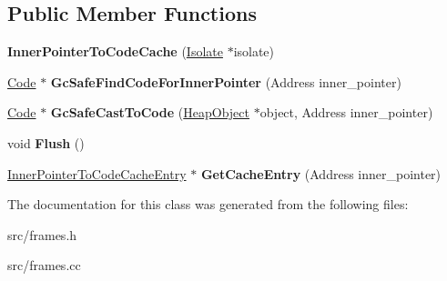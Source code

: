 \subsection*{Public Member Functions}
\begin{DoxyCompactItemize}
\item 
\hypertarget{classv8_1_1internal_1_1_inner_pointer_to_code_cache_aa5648205deaf18119d17308276caa507}{}{\bfseries Inner\+Pointer\+To\+Code\+Cache} (\hyperlink{classv8_1_1internal_1_1_isolate}{Isolate} $\ast$isolate)\label{classv8_1_1internal_1_1_inner_pointer_to_code_cache_aa5648205deaf18119d17308276caa507}

\item 
\hypertarget{classv8_1_1internal_1_1_inner_pointer_to_code_cache_a1df5ea3dd9db82fd4e5d59036f745f70}{}\hyperlink{classv8_1_1internal_1_1_code}{Code} $\ast$ {\bfseries Gc\+Safe\+Find\+Code\+For\+Inner\+Pointer} (Address inner\+\_\+pointer)\label{classv8_1_1internal_1_1_inner_pointer_to_code_cache_a1df5ea3dd9db82fd4e5d59036f745f70}

\item 
\hypertarget{classv8_1_1internal_1_1_inner_pointer_to_code_cache_ac65fa768c44e87a2ed6073f79903d2e6}{}\hyperlink{classv8_1_1internal_1_1_code}{Code} $\ast$ {\bfseries Gc\+Safe\+Cast\+To\+Code} (\hyperlink{classv8_1_1internal_1_1_heap_object}{Heap\+Object} $\ast$object, Address inner\+\_\+pointer)\label{classv8_1_1internal_1_1_inner_pointer_to_code_cache_ac65fa768c44e87a2ed6073f79903d2e6}

\item 
\hypertarget{classv8_1_1internal_1_1_inner_pointer_to_code_cache_a9a529de6174a47e94e76191e20e59830}{}void {\bfseries Flush} ()\label{classv8_1_1internal_1_1_inner_pointer_to_code_cache_a9a529de6174a47e94e76191e20e59830}

\item 
\hypertarget{classv8_1_1internal_1_1_inner_pointer_to_code_cache_a99ae60417d91f2a5504b40bfc55acc57}{}\hyperlink{structv8_1_1internal_1_1_inner_pointer_to_code_cache_1_1_inner_pointer_to_code_cache_entry}{Inner\+Pointer\+To\+Code\+Cache\+Entry} $\ast$ {\bfseries Get\+Cache\+Entry} (Address inner\+\_\+pointer)\label{classv8_1_1internal_1_1_inner_pointer_to_code_cache_a99ae60417d91f2a5504b40bfc55acc57}

\end{DoxyCompactItemize}


The documentation for this class was generated from the following files\+:\begin{DoxyCompactItemize}
\item 
src/frames.\+h\item 
src/frames.\+cc\end{DoxyCompactItemize}
